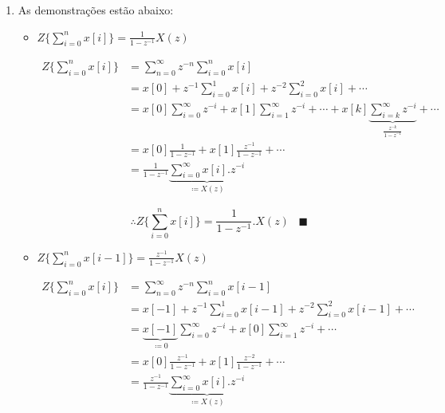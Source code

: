 \documentclass{article}
\begin{document}
\begin{enumerate}
\item %

As demonstrações estão abaixo:

\begin{itemize}
	\item $Z\{\sum_{i=0}^{n}x[i] \} = \frac{1}{1-z^{-1}}X(z)$
	
	\begin{equation}
	\begin{split}
	Z\{\sum_{i=0}^{n}x[i] \} & = \sum_{n=0}^{\infty} z^{-n} \sum_{i=0}^{n} x[i] \\
	& = x[0] + z^{-1} \sum_{i=0}^{1} x[i] + z^{-2} \sum_{i=0}^{2} x[i] + \cdots \\
	& = x[0] \sum_{i=0}^{\infty} z^{-i} + x[1] \sum_{i=1}^{\infty} z^{-i} + \cdots + x[k] 
	\underbrace{\sum_{i=k}^{\infty} z^{-i}}_{\frac{z^{-k}}{1 - z^{-1}}} + \cdots\\
	& = x[0] \frac{1}{1 - z^{-1}} + x[1] \frac{z^{-1}}{1 - z^{-1}} + \cdots \\
	& = \frac{1}{1 - z^{-1}} \underbrace{\sum_{i=0}^{\infty} x[i].z^{-i}}_{\coloneqq X(z)}
	\end{split}
	\end{equation}

	\begin{equation}
	\therefore Z\{\sum_{i=0}^{n}x[i] \} = \frac{1}{1-z^{-1}}.X(z) \hspace{10pt} \blacksquare
	\end{equation}
	
	\item $Z\{\sum_{i=0}^{n}x[i-1] \} = \frac{z^{-1}}{1-z^{-1}}X(z)$

	\begin{equation}
	\begin{split}
	Z\{\sum_{i=0}^{n}x[i] \} & = \sum_{n=0}^{\infty} z^{-n} \sum_{i=0}^{n} x[i-1] \\
	& = x[-1] + z^{-1} \sum_{i=0}^{1} x[i-1] + z^{-2} \sum_{i=0}^{2} x[i-1] + \cdots \\
	& = \underbrace{x[-1]}_{\coloneqq 0} \sum_{i=0}^{\infty} z^{-i} + x[0] \sum_{i=1}^{\infty} z^{-i} + \cdots \\
	& = x[0] \frac{z^{-1}}{1 - z^{-1}} + x[1] \frac{z^{-2}}{1 - z^{-1}} + \cdots \\
	& = \frac{z^{-1}}{1 - z^{-1}} \underbrace{\sum_{i=0}^{\infty} x[i].z^{-i}}_{\coloneqq X(z)}
	\end{split}
	\end{equation}


\end{itemize}
\end{enumerate}
\end{document}
